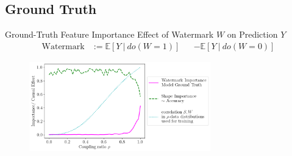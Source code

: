 \documentclass[German, aspectratio=169]{beamer}
\begin{document}
\subsection{Ground Truth}
\begin{frame}[t]{Ground-Truth Feature Importance}
    Effect of Watermark $W$ on Prediction $Y$ %
    \begin{align*}
        \displaystyle
        \mathrm{Watermark} & := \mathbb{E} [ Y \ | \ do(W=1) ] &  & - \mathbb{E} [ Y \ | \ do(W=0) ]
    \end{align*}
    \begin{figure}[t!]
        \centering
        \includegraphics[width=0.7\textwidth]{images/ground_truth.png}
        \label{fig:m0_m1}
    \end{figure}
\end{frame}

\end{document}
